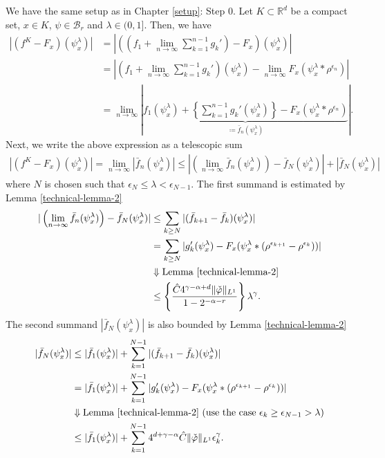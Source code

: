 We have the same setup as in Chapter \ref{setup}: Step 0. Let $K \subset \mathbb{R}^d$ be a compact set, $x \in K$, $\psi \in \mathcal{B}_r$ and $\lambda \in (0,1]$. Then, we have
\begin{align*}
    |(f^K - F_x)(\psi_x^\lambda)|
    &= |((f_1 + \lim_{n\to \infty}\sum_{k=1}^{n-1}g_k') - F_x)(\psi_x^\lambda)| \\
    &= |(f_1 + \lim_{n\to \infty}\sum_{k=1}^{n-1}g_k')(\psi_x^\lambda) - \lim_{n\to \infty} F_x(\psi_x^\lambda* \rho^{\epsilon_n})| \\
    &= \lim_{n \to \infty} |\underbrace{f_1(\psi_x^\lambda) + \left\{ \sum_{k=1}^{n-1}g_k'(\psi_x^\lambda) \right\} - F_x(\psi_x^\lambda* \rho^{\epsilon_n})}_{\coloneqq \bar f_n(\psi_x^\lambda)}|.
\end{align*}  
Next, we write the above expression as a telescopic sum 
\begin{align*}
    |(f^K - F_x)(\psi_x^\lambda)| = 
    \lim_{n \to \infty} |\bar f_n(\psi_x^\lambda)| \leq 
    | \left ( \lim_{n \to \infty} \bar f_n(\psi_x^\lambda) \right ) - \bar f_N(\psi_x^\lambda)|
    + |\bar f_N(\psi_x^\lambda)|
\end{align*}
where $N$ is chosen such that $\epsilon_N \leq \lambda < \epsilon_{N - 1}$. The first summand is estimated by Lemma \ref{technical-lemma-2}
\begin{align*}
    | \left( \lim_{n \to \infty} \bar f_n(\psi_x^\lambda)  \right) - \bar f_N(\psi_x^\lambda)| &\leq
    \sum_{k \geq N} |(\bar f_{k+1} - \bar f_{k})(\psi_x^\lambda)|\\ &= 
    \sum_{k \geq N} |g_k'(\psi^\lambda_x) - F_x(\psi^\lambda_x*(\rho^{\epsilon_{k+1}}-\rho^{\epsilon_k}))| \\
    &\Downarrow \text{Lemma \ref{technical-lemma-2}} \\
    &\leq \left \{ \frac{\hat C 4^{\gamma - \alpha + d} \lVert \check \varphi \rVert_{L^1} }{1-2^{-\alpha - r}} \right \} \lambda^{\gamma}.
\end{align*}
The second summand $|\bar f_N(\psi_x^\lambda)|$ is also bounded by Lemma \ref{technical-lemma-2}
\begin{align*}
    |\bar f_N(\psi_x^\lambda)| &\leq |\bar f_1(\psi_x^\lambda)| + \sum^{N-1}_{k=1} |(\bar f_{k+1}  - \bar f_k)(\psi_x^\lambda)|\\
    &= |\bar f_1(\psi_x^\lambda)| + \sum^{N-1}_{k=1} |g_k'(\psi^\lambda_x) - F_x(\psi^\lambda_x*(\rho^{\epsilon_{k+1}}-\rho^{\epsilon_k}))| \\
    &\Downarrow \parbox{25em}{Lemma \ref{technical-lemma-2} (use the case $\epsilon_k \geq \epsilon_{N-1} > \lambda$)}\\
    &\leq  |\bar f_1(\psi_x^\lambda)| + \sum^{N-1}_{k=1} 4^{d+\gamma-\alpha}\hat C \lVert \check \varphi \rVert_{L^1} \epsilon^\gamma_k.
\end{align*}
